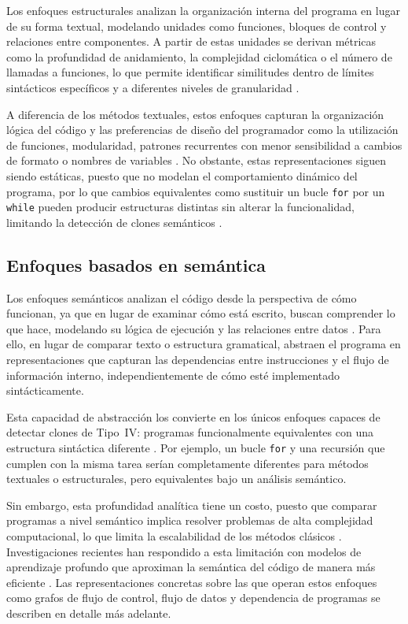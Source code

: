 Los enfoques estructurales analizan la organización interna del programa 
en lugar de su forma textual, modelando unidades como funciones, bloques 
de control y relaciones entre componentes. A partir de estas unidades se 
derivan métricas como la profundidad de anidamiento, la complejidad 
ciclomática o el número de llamadas a funciones, lo que permite identificar 
similitudes dentro de límites sintácticos específicos y a diferentes niveles 
de granularidad \cite{Roy2007Survey, Horvath2026ProgrammerAttribution}.

A diferencia de los métodos textuales, estos enfoques capturan la 
organización lógica del código y las preferencias de diseño del 
programador como la utilización de funciones, modularidad, patrones 
recurrentes con menor sensibilidad a cambios de formato o nombres de 
variables \cite{Horvath2026ProgrammerAttribution}. No obstante, estas
representaciones siguen siendo estáticas, puesto que no modelan el comportamiento 
dinámico del programa, por lo que cambios equivalentes como sustituir 
un bucle \texttt{for} por un \texttt{while} pueden producir estructuras 
distintas sin alterar la funcionalidad, limitando la detección de clones 
semánticos \cite{Roy2007Survey, karakatic2022software}.

\subsection{Enfoques basados en semántica}

Los enfoques semánticos analizan el código desde la perspectiva de cómo funcionan, ya que en lugar de examinar cómo está escrito, buscan 
comprender lo que hace, modelando su lógica de ejecución y las relaciones 
entre datos \cite{Roy2007Survey, Yu2023Graph}. Para ello, en lugar de 
comparar texto o estructura gramatical, abstraen el programa en 
representaciones que capturan las dependencias entre instrucciones y el 
flujo de información interno, independientemente de cómo esté 
implementado sintácticamente.

Esta capacidad de abstracción los convierte en los únicos enfoques capaces 
de detectar clones de Tipo~IV: programas funcionalmente equivalentes con una estructura sintáctica diferente \cite{Roy2007Survey, Yu2023Graph}. Por ejemplo, un bucle \texttt{for} y una recursión que cumplen con la misma tarea serían completamente diferentes para métodos textuales o estructurales, pero equivalentes bajo un análisis semántico.

Sin embargo, esta profundidad analítica tiene un costo, puesto que comparar programas 
a nivel semántico implica resolver problemas de alta complejidad 
computacional, lo que limita la escalabilidad de los métodos 
clásicos \cite{Yu2023Graph}. Investigaciones recientes han respondido a 
esta limitación con modelos de aprendizaje profundo que aproximan la 
semántica del código de manera más eficiente \cite{Yu2023Graph, 
Gagnon2025Beyond}. Las representaciones concretas sobre las que operan 
estos enfoques como grafos de flujo de control, flujo de datos y dependencia 
de programas se describen en detalle más adelante. 

